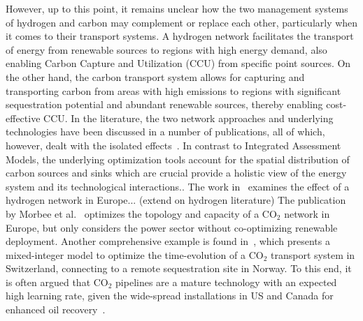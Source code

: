 \documentclass[twocolumn]{article}
\newcommand{\carbon}{CO$_2$}
\begin{document}
However, up to this point, it remains unclear how the two management systems of hydrogen and carbon may complement or replace each other, particularly when it comes to their transport systems. A hydrogen network facilitates the transport of energy from renewable sources to regions with high energy demand, also enabling Carbon Capture and Utilization (CCU) from specific point sources. On the other hand, the carbon transport system allows for capturing and transporting carbon from areas with high emissions to regions with significant sequestration potential and abundant renewable sources, thereby enabling cost-effective CCU.
In the literature, the two network approaches and underlying technologies have been discussed in a number of publications, all of which, however, dealt with the isolated effects~\cite{bakkenLinearModelsOptimization2008,morbeeOptimisedDeploymentEuropean2012,stewartFeasibilityEuropeanwideIntegrated2014,oeiModelingCarbonCapture2014,elahiMultiperiodLeastCost2014,burandtDecarbonizingChinaEnergy2019,middletonSimCCSOpensourceTool2020,bjerketvedtOptimalDesignCost2020,weiProposedGlobalLayout2021,damoreOptimalDesignEuropean2021,becattiniCarbonDioxideCapture2022}. In contrast to Integrated Assessment Models, the underlying optimization tools account for the spatial distribution of carbon sources and sinks which are crucial provide a holistic view of the energy system and its technological interactions.. The work in~\cite{neumannBenefitsHydrogenNetwork2022} examines the effect of a hydrogen network in Europe... (extend on hydrogen literature)
The publication by Morbee et al.~\cite{morbeeOptimisedDeploymentEuropean2012} optimizes the topology and capacity of a \carbon{} network in Europe, but only considers the power sector without co-optimizing renewable deployment.
Another comprehensive example is found in~\cite{becattiniCarbonDioxideCapture2022}, which presents a mixed-integer model to optimize the time-evolution of a \carbon{} transport system in Switzerland, connecting to a remote sequestration site in Norway. To this end, it is often argued that \carbon{} pipelines are a mature technology with an expected high learning rate, given the wide-spread installations in US and Canada for enhanced oil recovery~\cite{righettiSitingCarbonDioxide2017,friedmannNETZEROGEOSPHERICRETURN}.
\end{document}
